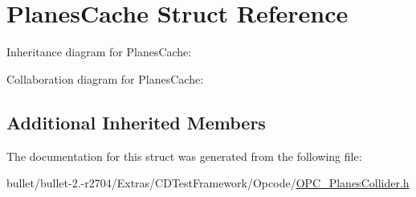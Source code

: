 \hypertarget{struct_planes_cache}{\section{Planes\+Cache Struct Reference}
\label{struct_planes_cache}
}


Inheritance diagram for Planes\+Cache\+:


Collaboration diagram for Planes\+Cache\+:
\subsection*{Additional Inherited Members}


The documentation for this struct was generated from the following file\+:\begin{DoxyCompactItemize}
\item 
bullet/bullet-\/2.-\/r2704/\+Extras/\+C\+D\+Test\+Framework/\+Opcode/\hyperlink{_o_p_c___planes_collider_8h}{O\+P\+C\+\_\+\+Planes\+Collider.\+h}\end{DoxyCompactItemize}
